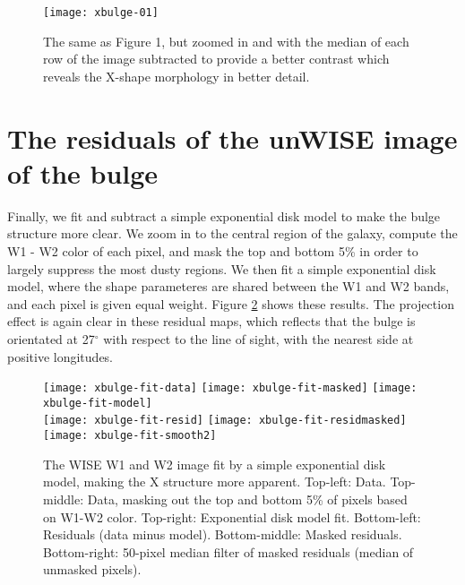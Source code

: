 \documentclass[12pt, preprint]{aastex}
\begin{document}
\begin{figure}[h!]
\centering
        \texttt{[image: xbulge-01]}
\caption{The same as Figure 1, but zoomed in and with the median of each row of the image subtracted to provide a better contrast which reveals the X-shape morphology in better detail.}
\label{fig:filt}
\end{figure}

\section{The residuals of the unWISE image of the bulge}

Finally, we fit and subtract a simple exponential disk model to make the bulge structure more clear.  We zoom in to the central region of the galaxy, compute the W1 - W2 color of each pixel, and mask the top and bottom 5\% in order to largely suppress the most dusty regions.  We then fit a simple exponential disk model, where the shape parameteres are shared between the W1 and W2 bands, and each pixel is given equal weight.
Figure \ref{fig:modfit} shows these results.
The projection effect is again clear in these residual maps, which reflects that the bulge is orientated at 27$^\circ$ with respect to the line of sight, with the nearest side at  positive longitudes. %

\begin{figure}[h!]
\centering
\texttt{[image: xbulge-fit-data]}
\texttt{[image: xbulge-fit-masked]}
\texttt{[image: xbulge-fit-model]}
\\
\texttt{[image: xbulge-fit-resid]}
\texttt{[image: xbulge-fit-residmasked]}
\texttt{[image: xbulge-fit-smooth2]}
\caption{%
  The WISE W1 and W2 image fit by a simple exponential disk
  model, making the X structure more apparent.
  Top-left: Data.  Top-middle: Data, masking out the top and bottom 5\%
  of pixels based on W1-W2 color.  Top-right: Exponential disk model fit.
  Bottom-left: Residuals (data minus model).  Bottom-middle: Masked residuals.
  Bottom-right: 50-pixel median filter of masked residuals (median of unmasked
  pixels).
  }
\label{fig:modfit}
\end{figure}
\end{document}
